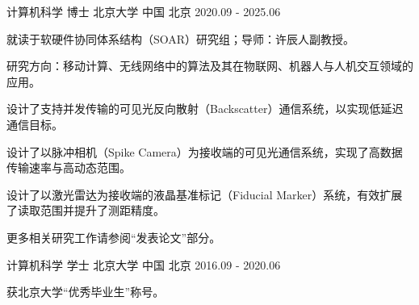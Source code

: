 \documentclass[11pt, a4paper]{awesome-cv-cn}
\begin{document}
\begin{cventries}
	
	\cventry
	{计算机科学 博士}
	{北京大学}
	{中国 北京}
	{2020.09 - 2025.06}
	{
		\begin{cvitems} %
			\item {就读于软硬件协同体系结构（SOAR）研究组；导师：许辰人副教授。}
			\item {研究方向：移动计算、无线网络中的算法及其在物联网、机器人与人机交互领域的应用。}
			\item {设计了支持并发传输的可见光反向散射（Backscatter）通信系统，以实现低延迟通信目标。}
			\item {设计了以脉冲相机（Spike Camera）为接收端的可见光通信系统，实现了高数据传输速率与高动态范围。}
			\item {设计了以激光雷达为接收端的液晶基准标记（Fiducial Marker）系统，有效扩展了读取范围并提升了测距精度。}
			\item {更多相关研究工作请参阅“发表论文”部分。}
		\end{cvitems}
	}
	
	\cventry
	{计算机科学 学士} %
	{北京大学} %
	{中国 北京} %
	{2016.09 - 2020.06} %
	{
		\begin{cvitems} %
			\item {获北京大学“优秀毕业生”称号。}
		\end{cvitems}
	}
	
\end{cventries}
\end{document}
